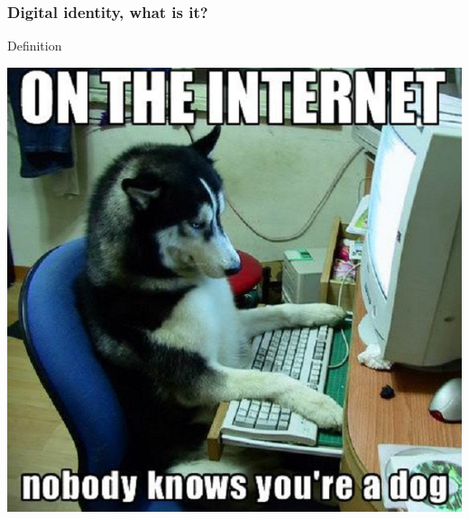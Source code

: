 \begin{frame}
\frametitle{Digital identity, what is it?}

\begin{block}{Definition}
\begin{itemize}
\end{itemize}
\end{block}
\begin{center}
\includegraphics[scale=0.5] {./materials/On-The-Internet-Nobody-Knows-Youre-A-Dog.jpg}
\end{center}

\end{frame}

